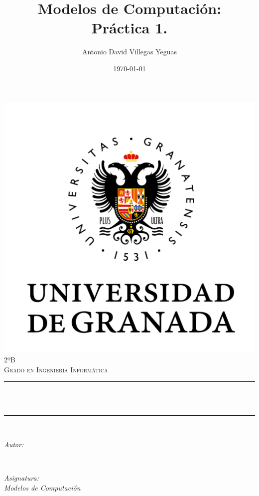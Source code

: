 \documentclass[12pt, spanish]{article}
\title{Modelos de Computación:\\
Práctica 1. \hspace{0.05cm} }
\author{Antonio David Villegas Yeguas}
\date{\today}
\makeatletter
\let\thetitle\@title
\let\theauthor\@author
\let\thedate\@date
\makeatother
\begin{document}

\begin{titlepage}
    \centering
    \vspace*{0.5 cm}
    \includegraphics[scale = 0.50]{ugr.png}\\[1.0 cm]
    \textsc{\large 2ºB}\\[0.5 cm]            
    \textsc{\large Grado en Ingeniería Informática}\\[0.5 cm]              
    \rule{\linewidth}{0.2 mm} \\[0.4 cm]
    { \huge \bfseries \thetitle}\\
    \rule{\linewidth}{0.2 mm} \\[1.5 cm]
    
    \begin{minipage}{0.4\textwidth}
        \begin{flushleft} \large
            \emph{Autor:}\\
            \theauthor
            \end{flushleft}
            \end{minipage}~
            \begin{minipage}{0.4\textwidth}
            \begin{flushright} \large
            \emph{Asignatura: \\
            Modelos de Computación}                   
        \end{flushright}
    \end{minipage}\\[1 cm]
  	
    {\large \thedate}\\[1 cm]
 	
    \vfill
    
\end{titlepage}
\end{document}
